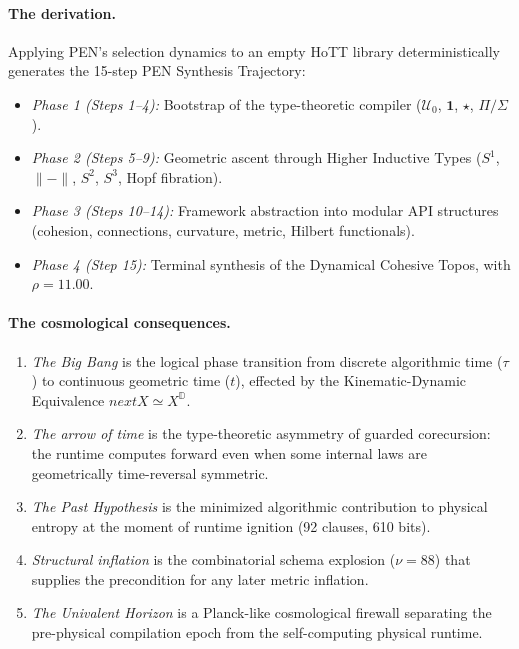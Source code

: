 \documentclass[11pt,a4paper]{article}
\def\bigcirc{next}%
\theoremstyle{plain}
\theoremstyle{definition}
\theoremstyle{remark}
\newcommand{\D}{\mathbb{D}}
\newcommand{\U}{\mathcal{U}}
\begin{document}
\paragraph{The derivation.}  Applying PEN's selection dynamics to an empty HoTT library deterministically generates the 15-step PEN Synthesis Trajectory:
\begin{itemize}[nosep]
    \item \emph{Phase 1 (Steps 1--4):} Bootstrap of the type-theoretic compiler ($\U_0$, $\mathbf{1}$, $\star$, $\Pi/\Sigma$).
    \item \emph{Phase 2 (Steps 5--9):} Geometric ascent through Higher Inductive Types ($S^1$, $\|-\|$, $S^2$, $S^3$, Hopf fibration).
    \item \emph{Phase 3 (Steps 10--14):} Framework abstraction into modular API structures (cohesion, connections, curvature, metric, Hilbert functionals).
    \item \emph{Phase 4 (Step 15):} Terminal synthesis of the Dynamical Cohesive Topos, with $\rho = 11.00$.
\end{itemize}

\paragraph{The cosmological consequences.}
\begin{enumerate}[nosep]
    \item \emph{The Big Bang} is the logical phase transition from discrete algorithmic time ($\tau$) to continuous geometric time ($t$), effected by the Kinematic-Dynamic Equivalence $\bigcirc X \simeq X^{\D}$.
    \item \emph{The arrow of time} is the type-theoretic asymmetry of guarded corecursion: the runtime computes forward even when some internal laws are geometrically time-reversal symmetric.
    \item \emph{The Past Hypothesis} is the minimized algorithmic contribution to physical entropy at the moment of runtime ignition (92 clauses, 610 bits).
    \item \emph{Structural inflation} is the combinatorial schema explosion ($\nu = 88$) that supplies the precondition for any later metric inflation.
    \item \emph{The Univalent Horizon} is a Planck-like cosmological firewall separating the pre-physical compilation epoch from the self-computing physical runtime.
\end{enumerate}
\end{document}
